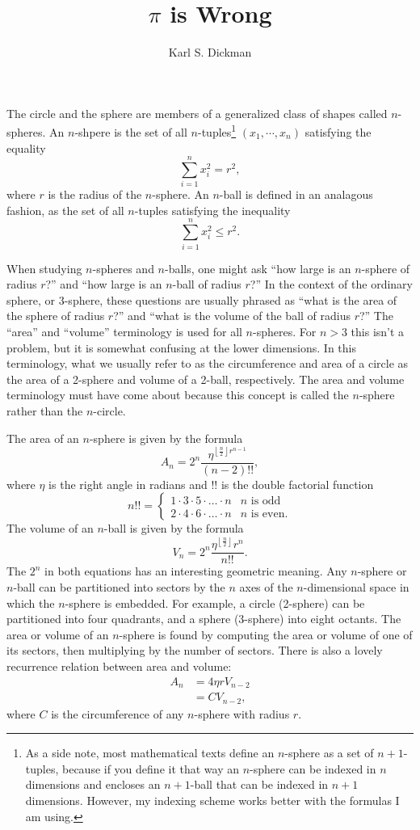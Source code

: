 \documentclass{article}
\title{$\pi$ is Wrong}
\author{Karl S. Dickman}
\date{}
\begin{document}
\maketitle
The circle and the sphere are members of a generalized class of shapes called
$n$-spheres. An $n$-shpere is the set of all $n$-tuples\footnote{
As a side note, most mathematical texts define an $n$-sphere as a set of
$n+1$-tuples, because if you define it that way an $n$-sphere can be indexed in
$n$ dimensions and encloses an $n+1$-ball that can be indexed in $n+1$
dimensions. However, my indexing scheme works better with the formulas I am
using.
}
$(x_1, \cdots , x_n)$
satisfying the equality
\[
    \sum_{i=1}^n x_i^2=r^2,
\]
where $r$ is the radius of the $n$-sphere. An $n$-ball is defined in an
analagous fashion, as the set of all $n$-tuples satisfying the inequality
\[
    \sum_{i=1}^n x_i^2 \le r^2.
\]

When studying $n$-spheres and $n$-balls, one might ask ``how large is an
$n$-sphere of radius $r$?'' and ``how large is an $n$-ball of radius $r$?'' In the
context of the ordinary sphere, or 3-sphere, these questions are usually phrased
as ``what is the area of the sphere of radius $r$?'' and ``what is the volume of
the ball of radius $r$?'' The ``area'' and ``volume'' terminology is used for
all $n$-spheres. For $n>3$ this isn't a problem, but it is somewhat confusing at
the lower dimensions. In this terminology, what we usually refer to as the
circumference and area of a circle as the area of a 2-sphere and volume of a
2-ball, respectively. The area and volume terminology must have come about
because this concept is called the $n$-sphere rather than the $n$-circle.

The area of an $n$-sphere is given by the formula
\[
    A_n = 2^n \frac
        {\eta^{\left \lfloor \frac{n}{2} \right \rfloor r^{n-1}}}
        {(n-2)!!},
\]
where $\eta$ is the right angle in radians and $!!$ is the double factorial
function
\[
    n!! = \begin{cases}
        1 \cdot 3 \cdot 5 \cdot \ldots \cdot n & n \mbox{ is odd} \\
        2 \cdot 4 \cdot 6 \cdot \ldots \cdot n & n \mbox{ is even.}
        \end {cases}
\]
The volume of an $n$-ball is given by the formula
\[
    V_n = 2^n \frac
        {\eta^{\left \lfloor \frac{n}{2} \right \rfloor} r^n}
        {n!!}.
\]
The $2^n$ in both equations has an interesting geometric meaning. Any $n$-sphere
or $n$-ball can be partitioned into sectors by the $n$ axes of the
$n$-dimensional space in which the $n$-sphere is embedded. For example, a
circle (2-sphere) can be partitioned into four quadrants, and a sphere
(3-sphere) into eight octants. The area or volume of an $n$-sphere is found by
computing the area or volume of one of its sectors, then multiplying by the
number of sectors.  There is also a lovely recurrence relation between area and
volume:
\begin{align*}
    A_n & = 4\eta rV_{n-2} \\
        & = CV_{n-2},
\end{align*}
where $C$ is the circumference of any $n$-sphere with radius $r$.
\end{document}

